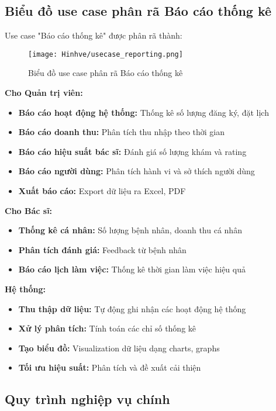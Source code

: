 \documentclass[../DoAn.tex]{subfiles}
\begin{document}
\subsection{Biểu đồ use case phân rã Báo cáo thống kê}
\label{subsection:2.2.7}

Use case "Báo cáo thống kê" được phân rã thành:

\begin{figure}[H]
    \centering
    \texttt{[image: Hinhve/usecase\_reporting.png]}
    \caption{Biểu đồ use case phân rã Báo cáo thống kê}
    \label{fig:usecase_reporting}
\end{figure}

\textbf{Cho Quản trị viên:}
\begin{itemize}
    \item \textbf{Báo cáo hoạt động hệ thống:} Thống kê số lượng đăng ký, đặt lịch
    \item \textbf{Báo cáo doanh thu:} Phân tích thu nhập theo thời gian
    \item \textbf{Báo cáo hiệu suất bác sĩ:} Đánh giá số lượng khám và rating
    \item \textbf{Báo cáo người dùng:} Phân tích hành vi và sở thích người dùng
    \item \textbf{Xuất báo cáo:} Export dữ liệu ra Excel, PDF
\end{itemize}

\textbf{Cho Bác sĩ:}
\begin{itemize}
    \item \textbf{Thống kê cá nhân:} Số lượng bệnh nhân, doanh thu cá nhân
    \item \textbf{Phân tích đánh giá:} Feedback từ bệnh nhân
    \item \textbf{Báo cáo lịch làm việc:} Thống kê thời gian làm việc hiệu quả
\end{itemize}

\textbf{Hệ thống:}
\begin{itemize}
    \item \textbf{Thu thập dữ liệu:} Tự động ghi nhận các hoạt động hệ thống
    \item \textbf{Xử lý phân tích:} Tính toán các chỉ số thống kê
    \item \textbf{Tạo biểu đồ:} Visualization dữ liệu dạng charts, graphs
    \item \textbf{Tối ưu hiệu suất:} Phân tích và đề xuất cải thiện
\end{itemize}

\subsection{Quy trình nghiệp vụ chính}
\label{subsection:2.2.8}
\end{document}

